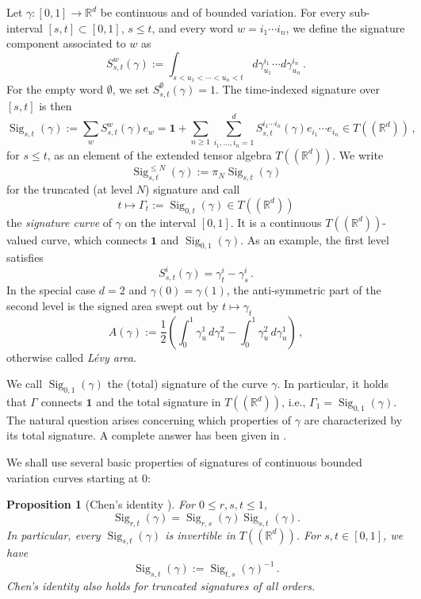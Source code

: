 \documentclass[11pt]{article}
\newtheorem{proposition}[theorem]{Proposition}
\theoremstyle{definition}
\newcommand{\R}{\mathbb{R}}
\newcommand{\Sig}{\operatorname{Sig}}
\newcommand{\id}{\mathbf{1}}
\newcommand{\proj}[1]{\pi_{#1}}
\begin{document}
Let $\gamma:[0,1]\to\R^d$ be continuous and of bounded variation. For every sub-interval $[s,t]\subset[0,1]$, $s\leq t$, and every word $w=i_1\cdots i_n$, we define the signature component associated to $w$ as
\[
  S^w_{s,t}(\gamma)
  :=
  \int_{s<u_1<\cdots<u_n<t}
  d\gamma^{i_1}_{u_1}\cdots d\gamma^{i_n}_{u_n} \, .
\]
For the empty word \(\emptyset\), we set \(S^{\emptyset}_{s,t}(\gamma)=1\). The time-indexed signature over \([s,t]\) is then
\[
  \Sig_{s,t}(\gamma)
  :=
  \sum_w S^w_{s,t}(\gamma)e_w
  =
  \id +
  \sum_{n\geq 1}\sum_{i_1,\ldots,i_n=1}^d
  S^{i_1\cdots i_n}_{s,t}(\gamma)e_{i_1}\cdots e_{i_n}
  \in T((\R^d)) \, ,
\]
for $s \leq t$, as an element of the extended tensor algebra $T((\mathbb{R}^d))$. We write
\[
  \Sig^{\leq N}_{s,t}(\gamma):=\proj{N}\Sig_{s,t}(\gamma)
\]
for the truncated (at level $N$) signature and call
\[
t \mapsto  \Gamma_t:=\Sig_{0,t}(\gamma) \in T((\mathbb{R}^d))
\]
the \emph{signature curve} of $\gamma$ on the interval $[0,1]$. It is a continuous $T((\R^d))$-valued curve, which connects $\id$ and $\Sig_{0,1}(\gamma)$. As an example, the first level satisfies
\[
  S^i_{s,t}(\gamma)=\gamma^i_t-\gamma^i_s \, .
\]
In the special case $d=2$ and $\gamma(0)=\gamma(1)$, the anti-symmetric part of the second level is the signed area swept out by $ t \mapsto \gamma_t $
\begin{equation}\label{eq:LevyArea}
      A(\gamma)
  :=
  \frac12\left(\int_0^1 \gamma^1_u\,d\gamma^2_u
  -\int_0^1 \gamma^2_u\,d\gamma^1_u\right) \, ,
\end{equation}
otherwise called \emph{Lévy area}.

We call $ \Sig_{0,1}(\gamma)$ the (total) signature of the curve $\gamma$. In particular, it holds that $\Gamma$ connects $\id$ and the total signature in $T((\R^d))$, i.e., $\Gamma_1=\Sig_{0,1}(\gamma)$. The natural question arises concerning which properties of $\gamma$ are characterized by its total signature. A complete answer has been given in \cite{HL2010}.

We shall use several basic properties of signatures of continuous bounded variation curves starting at $0$:

\begin{proposition}[Chen's identity \cite{C1954}]\label{prop:chen}
For $ 0\leq r, s, t \leq 1$,
\[
  \Sig_{r,t}(\gamma)=\Sig_{r,s}(\gamma)\Sig_{s,t}(\gamma).
\]
In particular, every $\Sig_{s,t}(\gamma)$ is invertible in $T((\mathbb{R}^d))$. For $ s,t \in [0,1]$, we have
\[
  \Sig_{s,t}(\gamma):=\Sig_{t,s}(\gamma)^{-1} \, .
\]
Chen's identity also holds for truncated signatures of all orders.
\end{proposition}
\end{document}
